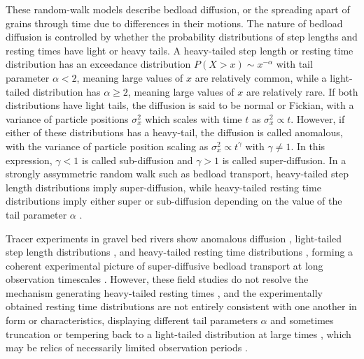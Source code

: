 \documentclass[draft]{agujournal2018}
\begin{document}
These random-walk models describe bedload diffusion, or the spreading apart of grains through time due to differences in their motions.
The nature of bedload diffusion is controlled by whether the probability distributions of step lengths and resting times have light or heavy tails.
A heavy-tailed step length or resting time distribution has an exceedance distribution $P(X>x) \sim x^{-\alpha}$ with tail parameter $\alpha < 2$, meaning large values of $x$ are relatively common, while a light-tailed distribution has $\alpha \geq 2$, meaning large values of $x$ are relatively rare.
If both distributions have light tails, the diffusion is said to be normal or Fickian, with a variance of particle positions $\sigma_x^2$ which scales with time $t$ as $\sigma_x^2 \propto t$.
However, if either of these distributions has a heavy-tail, the diffusion is called anomalous, with the variance of particle position scaling as $\sigma_x^2 \propto t^\gamma$ with $\gamma\neq 1$.
In this expression, $\gamma <1$ is called sub-diffusion and $\gamma > 1$ is called super-diffusion.
In a strongly assymmetric random walk such as bedload transport, heavy-tailed step length distributions imply super-diffusion, while heavy-tailed resting time distributions imply either super or sub-diffusion depending on the value of the tail parameter $\alpha$ \citep{Weeks1996, Weeks1998}.

Tracer experiments in gravel bed rivers show anomalous diffusion \citep{Phillips2013, Bradley2017}, light-tailed step length distributions \citep{Bradley2012, Hassan2013}, and heavy-tailed resting time distributions \citep{Voepel2013, Olinde2015, Pretzlav2016, Bradley2017}, forming a coherent experimental picture of super-diffusive bedload transport at long observation timescales \citep{Nikora2002, Martin2012}.
However, these field studies do not resolve the mechanism generating heavy-tailed resting times \citep[e.g.][]{Bradley2017}, and the experimentally obtained resting time distributions are not entirely consistent with one another in form or characteristics, displaying different tail parameters $\alpha$ and sometimes truncation \citep[e.g.][]{Voepel2013} or tempering back to a light-tailed distribution at large times \citep[e.g.][]{Bradley2017}, which may be relics of necessarily limited observation periods \citep[e.g.][]{Bradley2017}.
\end{document}
